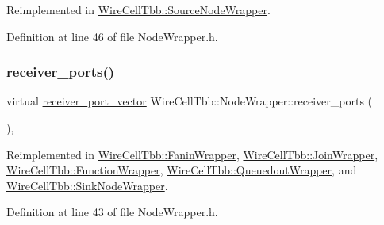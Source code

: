 Reimplemented in \hyperlink{class_wire_cell_tbb_1_1_source_node_wrapper_a59e1229e8eca5c2510d95e405cce9f42}{Wire\+Cell\+Tbb\+::\+Source\+Node\+Wrapper}.



Definition at line 46 of file Node\+Wrapper.\+h.

\mbox{\label{class_wire_cell_tbb_1_1_node_wrapper_ac3c636904e4d3d1df0939906dd8853c7}} 
\subsubsection{\texorpdfstring{receiver\+\_\+ports()}{receiver\_ports()}}
{\footnotesize\ttfamily virtual \hyperlink{namespace_wire_cell_tbb_a87f42fe8a3ccc3bf9d315cb2d252c7af}{receiver\+\_\+port\+\_\+vector} Wire\+Cell\+Tbb\+::\+Node\+Wrapper\+::receiver\+\_\+ports (\begin{DoxyParamCaption}{ }\end{DoxyParamCaption})\hspace{0.3cm}{\ttfamily [inline]}, {\ttfamily [virtual]}}



Reimplemented in \hyperlink{class_wire_cell_tbb_1_1_fanin_wrapper_a9aa4c230eacef36c2ebbb26fe34412c4}{Wire\+Cell\+Tbb\+::\+Fanin\+Wrapper}, \hyperlink{class_wire_cell_tbb_1_1_join_wrapper_ac6d333cda577fcf066561dd48f134440}{Wire\+Cell\+Tbb\+::\+Join\+Wrapper}, \hyperlink{class_wire_cell_tbb_1_1_function_wrapper_a7d856ca70ebeb8947ce18c1a711f60ac}{Wire\+Cell\+Tbb\+::\+Function\+Wrapper}, \hyperlink{class_wire_cell_tbb_1_1_queuedout_wrapper_ad834a6bf647b8ee3126b868f7f37c80f}{Wire\+Cell\+Tbb\+::\+Queuedout\+Wrapper}, and \hyperlink{class_wire_cell_tbb_1_1_sink_node_wrapper_a09c612e3812953234b60b9e184c598cd}{Wire\+Cell\+Tbb\+::\+Sink\+Node\+Wrapper}.



Definition at line 43 of file Node\+Wrapper.\+h.

